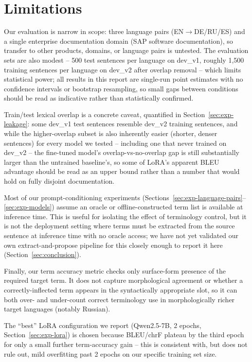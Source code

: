 \documentclass[11pt]{article}
\begin{document}
\section*{Limitations}

Our evaluation is narrow in scope: three language pairs (EN$\to$DE/RU/ES) and a single enterprise documentation domain (SAP software documentation), so transfer to other products, domains, or language pairs is untested. The evaluation sets are also modest -- 500 test sentences per language on dev\_v1, roughly 1{,}500 training sentences per language on dev\_v2 after overlap removal -- which limits statistical power; all results in this report are single-run point estimates with no confidence intervals or bootstrap resampling, so small gaps between conditions should be read as indicative rather than statistically confirmed.

Train/test lexical overlap is a concrete caveat, quantified in Section~\ref{sec:exp-leakage}: some dev\_v1 test sentences resemble dev\_v2 training sentences, and while the higher-overlap subset is also inherently easier (shorter, denser sentences) for every model we tested -- including one that never trained on dev\_v2 -- the fine-tuned model's overlap-vs-no-overlap gap is still substantially larger than the untrained baseline's, so some of LoRA's apparent BLEU advantage should be read as an upper bound rather than a number that would hold on fully disjoint documentation.

Most of our prompt-conditioning experiments (Sections~\ref{sec:exp-language-pairs}--\ref{sec:exp-models}) assume an oracle or offline-constructed term list is available at inference time. This is useful for isolating the effect of terminology control, but it is not the deployment setting where terms must be extracted from the source sentence at inference time with no oracle access; we have not yet validated our own extract-and-propose pipeline for this closely enough to report it here (Section~\ref{sec:conclusion}).

Finally, our term accuracy metric checks only surface-form presence of the required target term. It does not capture morphological agreement or whether a correctly-inflected term appears in the syntactically appropriate slot, so it can both over- and under-count correct terminology use in morphologically richer target languages (notably Russian).

The ``best'' LoRA configuration we report (Qwen2.5-7B, 2 epochs, Section~\ref{sec:exp-lora}) is chosen because BLEU/chrF plateau by the third epoch for only a small further term-accuracy gain -- this is consistent with, but does not rule out, mild overfitting past 2 epochs on our specific training set size.
\end{document}
